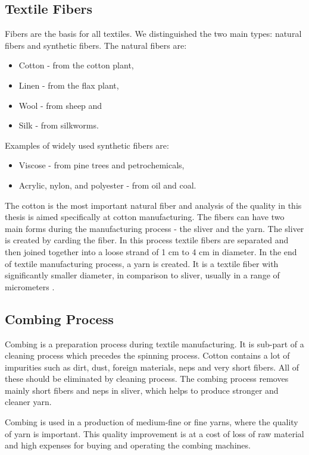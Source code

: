 \documentclass[twoside]{ctuthesis}
\theoremstyle{plain}
\theoremstyle{definition}
\theoremstyle{note}
\begin{document}
\subsection{Textile Fibers}
\label{textileFibers}
Fibers are the basis for all textiles. We distinguished the two main types: natural fibers and synthetic fibers. The natural fibers are:
\begin{itemize}
	\setlength{\itemsep}{5pt}
\item Cotton - from the cotton plant,
\item Linen - from the flax plant,
\item Wool - from sheep and
\item Silk - from silkworms.
\end{itemize}
Examples of widely used synthetic fibers are:
\begin{itemize}
	\setlength{\itemsep}{5pt}
\item Viscose - from pine trees and petrochemicals,

\item Acrylic, nylon, and polyester - from oil and coal. 
\end{itemize}
The cotton is the most important natural fiber and analysis of the quality in this thesis is aimed specifically at cotton manufacturing. 
The fibers can have two main forms during the manufacturing process - the sliver and the yarn. The sliver is created by carding the fiber. In this process textile fibers are separated and then joined together into a loose strand of 1 cm to 4 cm in diameter. In the end of textile manufacturing process, a yarn is created. It is a textile fiber with significantly smaller diameter, in comparison to sliver, usually in a range of micrometers \cite{cite:FoFF}. 
\subsection{Combing Process}
Combing is a preparation process during textile manufacturing. It is sub-part of a cleaning process which precedes the spinning process. Cotton contains a lot of impurities such as dirt, dust, foreign materials, neps and very short fibers. All of these should be eliminated by cleaning process. The combing process removes mainly short fibers and neps in sliver, which helps to produce stronger and cleaner yarn.

Combing is used in a production of medium-fine or fine yarns, where the quality of yarn is important. This quality improvement is at a cost of loss of raw material and high expenses for buying and operating the combing machines. 
\end{document}
